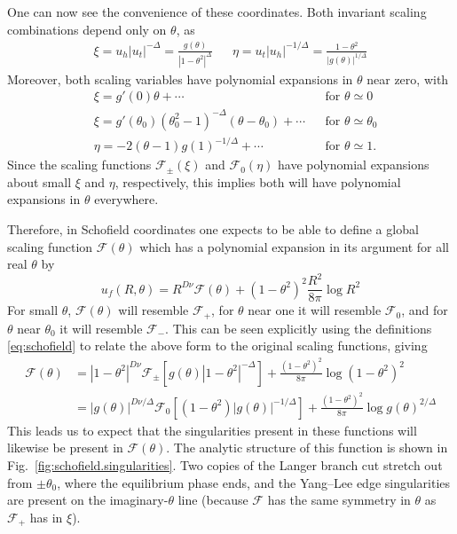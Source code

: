 \documentclass[
aps,
pre,
preprint,
longbibliography,
floatfix
]{revtex4-2}
\begin{document}
One can now see the convenience of these coordinates. Both invariant scaling
combinations depend only on $\theta$, as
\begin{align}
  \xi=u_h|u_t|^{-\Delta}=\frac{g(\theta)}{|1-\theta^2|^{\Delta}} &&
  \eta=u_t|u_h|^{-1/\Delta}=\frac{1-\theta^2}{|g(\theta)|^{1/\Delta}}
\end{align}
Moreover, both scaling variables have polynomial expansions in $\theta$ near
zero, with
\begin{align}
  &\xi= g'(0)\theta+\cdots  && \text{for $\theta\simeq0$}\\
  &\xi=g'(\theta_0)(\theta_0^2-1)^{-\Delta}(\theta-\theta_0)+\cdots && \text{for $\theta\simeq\theta_0$}
  \\
  &\eta=-2(\theta-1)g(1)^{-1/\Delta}+\cdots && \text{for $\theta\simeq1$}.
\end{align}
Since the scaling functions $\mathcal F_\pm(\xi)$ and $\mathcal F_0(\eta)$ have
polynomial expansions about small $\xi$ and $\eta$, respectively, this implies
both will have polynomial expansions in $\theta$ everywhere.

Therefore, in Schofield coordinates one expects to be able to define a global
scaling function $\mathcal F(\theta)$ which has a polynomial expansion in its
argument for all real $\theta$ by
\begin{equation}
  u_f(R,\theta)=R^{D\nu}\mathcal F(\theta)+(1-\theta^2)^2\frac{R^2}{8\pi}\log R^2
\end{equation}
For small $\theta$, $\mathcal F(\theta)$ will
resemble $\mathcal F_+$, for $\theta$ near one it will resemble $\mathcal F_0$,
and for $\theta$ near $\theta_0$ it will resemble $\mathcal F_-$. This can be
seen explicitly using the definitions \eqref{eq:schofield} to relate the above
form to the original scaling functions, giving
\begin{equation} \label{eq:scaling.function.equivalences.2d}
  \begin{aligned}
    \mathcal F(\theta)
    &=|1-\theta^2|^{D\nu}\mathcal F_\pm\left[g(\theta)|1-\theta^2|^{-\Delta}\right]
    +\frac{(1-\theta^2)^2}{8\pi}\log(1-\theta^2)^2\\
    &=|g(\theta)|^{D\nu/\Delta}\mathcal F_0\left[(1-\theta^2)|g(\theta)|^{-1/\Delta}\right]
    +\frac{(1-\theta^2)^2}{8\pi}\log g(\theta)^{2/\Delta}
  \end{aligned}
\end{equation}
This leads us
to expect that the singularities present in these functions will likewise be
present in $\mathcal F(\theta)$. The analytic structure of this function is
shown in Fig.~\ref{fig:schofield.singularities}. Two copies of the Langer
branch cut stretch out from $\pm\theta_0$, where the equilibrium phase ends,
and the Yang--Lee edge singularities are present on the imaginary-$\theta$
line (because  $\mathcal F$ has the same symmetry in $\theta$
as $\mathcal F_+$ has in $\xi$).
\end{document}
